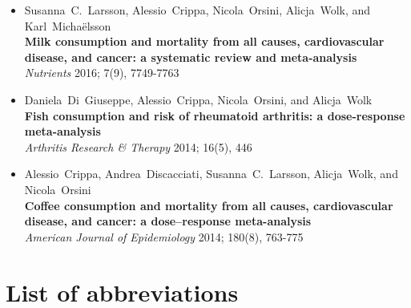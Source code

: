 \documentclass[11pt,a4paper,twoside,openany]{book}\usepackage{knitr}
\makeatletter
\def\cleardoublepage{\clearpage\if@twoside
\ifodd\c@page
\else\hbox{}\thispagestyle{empty}\newpage
\if@twocolumn\hbox{}\newpage\fi\fi\fi}
\makeatother
\begin{document}
{{\begin{itemize}
\item Susanna~C.~Larsson, Alessio~Crippa, Nicola~Orsini, Alicja~Wolk, and Karl~Micha{\"e}lsson \\ \textbf{Milk consumption and mortality from all causes, cardiovascular disease, and cancer: a systematic review and meta-analysis} \\ \textit{Nutrients} 2016; 7(9), 7749-7763
\item Daniela~Di~Giuseppe, Alessio~Crippa, Nicola~Orsini, and Alicja~Wolk \\ \textbf{Fish consumption and risk of rheumatoid arthritis: a dose-response meta-analysis} \\ \textit{Arthritis Research \& Therapy} 2014; 16(5), 446
\item Alessio~Crippa, Andrea~Discacciati, Susanna~C.~Larsson, Alicja~Wolk, and Nicola~Orsini \\ \textbf{Coffee consumption and mortality from all causes, cardiovascular disease, and cancer: a dose--response meta-analysis} \\ \textit{American Journal of Epidemiology} 2014; 180(8), 763-775
\end{itemize}
\cleardoublepage
{}
\tableofcontents
{} 

%

\chapter*{List of abbreviations}
\begin{tabular}{ll}


\end{tabular}}}
\end{document}
